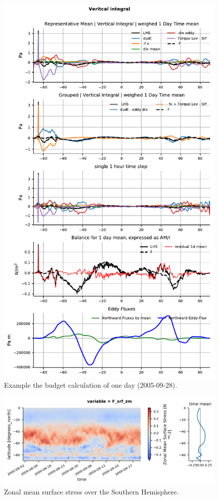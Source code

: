 \documentclass[11pt]{article}
\numberwithin{equation}{section}
\begin{document}
\begin{figure}[h!]
\centerline{\includegraphics[scale=.7]{exmpl_repres_dmean_ps_iews_2005-09-28.pdf}}
\caption{Example the budget calculation of one day (2005-09-28).}
\label{fig:AM_example2}
\end{figure}


\begin{figure}[h!]
\centerline{\includegraphics[scale=.8]{F_srf_zm.png}}
\caption{Zonal mean surface stress over the Southern Hemisphere.}
\label{fig:AM_example3}
\end{figure}
\end{document}
